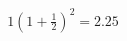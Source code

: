 \documentclass[preview]{standalone}
\begin{document}
\begin{align*}
1\left( 1 + \frac{1}{2} \right)^2 = 2.25
\end{align*}
\end{document}
